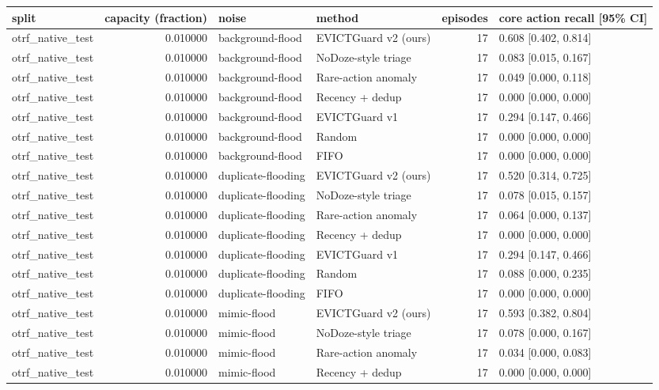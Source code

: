 \begin{tabular}{lrllrl}
\toprule
split & capacity (fraction) & noise & method & episodes & core action recall [95\% CI] \\
\midrule
otrf\_native\_test & 0.010000 & background-flood & EVICTGuard v2 (ours) & 17 & 0.608 [0.402, 0.814] \\
otrf\_native\_test & 0.010000 & background-flood & NoDoze-style triage & 17 & 0.083 [0.015, 0.167] \\
otrf\_native\_test & 0.010000 & background-flood & Rare-action anomaly & 17 & 0.049 [0.000, 0.118] \\
otrf\_native\_test & 0.010000 & background-flood & Recency + dedup & 17 & 0.000 [0.000, 0.000] \\
otrf\_native\_test & 0.010000 & background-flood & EVICTGuard v1 & 17 & 0.294 [0.147, 0.466] \\
otrf\_native\_test & 0.010000 & background-flood & Random & 17 & 0.000 [0.000, 0.000] \\
otrf\_native\_test & 0.010000 & background-flood & FIFO & 17 & 0.000 [0.000, 0.000] \\
otrf\_native\_test & 0.010000 & duplicate-flooding & EVICTGuard v2 (ours) & 17 & 0.520 [0.314, 0.725] \\
otrf\_native\_test & 0.010000 & duplicate-flooding & NoDoze-style triage & 17 & 0.078 [0.015, 0.157] \\
otrf\_native\_test & 0.010000 & duplicate-flooding & Rare-action anomaly & 17 & 0.064 [0.000, 0.137] \\
otrf\_native\_test & 0.010000 & duplicate-flooding & Recency + dedup & 17 & 0.000 [0.000, 0.000] \\
otrf\_native\_test & 0.010000 & duplicate-flooding & EVICTGuard v1 & 17 & 0.294 [0.147, 0.466] \\
otrf\_native\_test & 0.010000 & duplicate-flooding & Random & 17 & 0.088 [0.000, 0.235] \\
otrf\_native\_test & 0.010000 & duplicate-flooding & FIFO & 17 & 0.000 [0.000, 0.000] \\
otrf\_native\_test & 0.010000 & mimic-flood & EVICTGuard v2 (ours) & 17 & 0.593 [0.382, 0.804] \\
otrf\_native\_test & 0.010000 & mimic-flood & NoDoze-style triage & 17 & 0.078 [0.000, 0.167] \\
otrf\_native\_test & 0.010000 & mimic-flood & Rare-action anomaly & 17 & 0.034 [0.000, 0.083] \\
otrf\_native\_test & 0.010000 & mimic-flood & Recency + dedup & 17 & 0.000 [0.000, 0.000] \\

\end{tabular}
